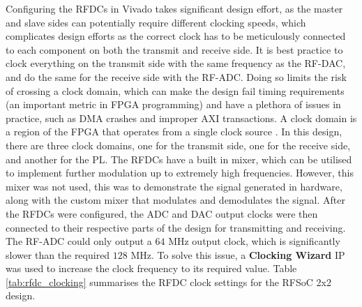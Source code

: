 \documentclass[12pt, a4paper]{article}
\begin{document}
Configuring the RFDCs in Vivado takes significant design effort, as the master and slave sides can potentially require different clocking speeds, which complicates design efforts as the correct clock has to be meticulously connected to each component on both the transmit and receive side. It is best practice to clock everything on the transmit side with the same frequency as the RF-DAC, and do the same for the receive side with the RF-ADC. Doing so limits the risk of crossing a clock domain, which can make the design fail timing requirements (an important metric in FPGA programming) and have a plethora of issues in practice, such as DMA crashes and improper AXI transactions. A clock domain is a region of the FPGA that operates from a single clock source \cite{ClockDomainCrossing}. In this design, there are three clock domains, one for the transmit side, one for the receive side, and another for the PL. The RFDCs have a built in mixer, which can be utilised to implement further modulation up to extremely high frequencies. However, this mixer was not used, this was to demonstrate the signal generated in hardware, along with the custom mixer that modulates and demodulates the signal. After the RFDCs were configured, the ADC and DAC output clocks were then connected to their respective parts of the design for transmitting and receiving. The RF-ADC could only output a $64$ MHz output clock, which is significantly slower than the required $128$ MHz. To solve this issue, a \textbf{Clocking Wizard} IP was used to increase the clock frequency to its required value. Table \ref{tab:rfdc_clocking} summarises the RFDC clock settings for the RFSoC 2x2 design.
\end{document}

